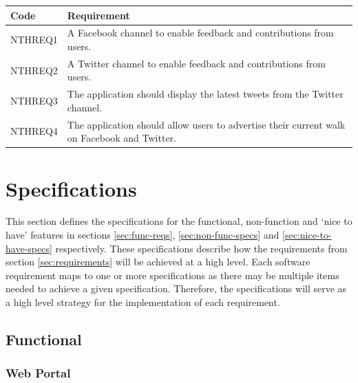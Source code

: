 \documentclass[11pt,a4paper]{article}
\begin{document}
\begin{longtable}{|p{2.5cm}p{13cm}|}
\hline
\textbf{Code} & \textbf{Requirement} \\

\hline
NTHREQ1 & A Facebook channel to enable feedback and contributions from users. \\ \hline
NTHREQ2 & A Twitter channel to enable feedback and contributions from users. \\ \hline
NTHREQ3 & The application should display the latest tweets from the Twitter channel. \\ \hline
NTHREQ4 & The application should allow users to advertise their current walk on Facebook and Twitter. \\ \hline
\end{longtable}

\section{Specifications}
\label{sec:specifications}

This section defines the specifications for the functional, non-function and `nice to have' features in sections \ref{sec:func-reqs}, \ref{sec:non-func-specs} and \ref{sec:nice-to-have-specs} respectively.
These specifications describe how the requirements from section \ref{sec:requirements} will be achieved at a high level.
Each software requirement maps to one or more specifications as there may be multiple items needed to achieve a given specification.
Therefore, the specifications will serve as a high level strategy for the implementation of each requirement.

\subsection{Functional}
\label{sec:func-specs}

\subsubsection{Web Portal}
\end{document}
